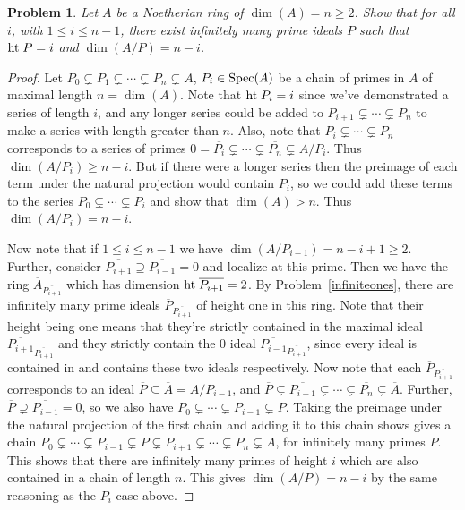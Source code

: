 \documentclass{article}
\newcommand{\spec}{\textup{Spec}}
\newcommand{\Ht}{\textup{ht}\;}
\newtheorem{problem}{Problem}
\begin{document}
\begin{problem}
Let $A$ be a Noetherian ring of $\dim(A) = n \geq 2$. Show that for all $i$, with $1 \leq i \leq n-1$, there exist infinitely many prime ideals $P$ such that $\Ht P = i$ and $\dim(A/P) = n-i$.
\end{problem}
\begin{proof}
Let $P_0 \subsetneq P_1 \subsetneq \cdots \subsetneq P_n \subsetneq A$, $P_i \in \spec(A)$ be a chain of primes in $A$ of maximal length $n = \dim(A)$. Note that $\Ht P_i = i$ since we've demonstrated a series of length $i$, and any longer series could be added to $P_{i+1} \subsetneq \cdots \subsetneq P_n$ to make a series with length greater than $n$. Also, note that $P_i \subsetneq \cdots \subsetneq P_n$ corresponds to a series of primes $0 = \overline{P_i} \subsetneq \cdots \subsetneq \overline{P_n} \subsetneq A/P_i$. Thus $\dim(A/P_i) \geq n-i$. But if there were a longer series then the preimage of each term under the natural projection would contain $P_i$, so we could add these terms to the series $P_0 \subsetneq \cdots \subsetneq P_i$ and show that $\dim(A) > n$. Thus $\dim(A/P_i) = n - i$.

Now note that if $1 \leq i \leq n-1$ we have $\dim(A/P_{i-1}) = n - i + 1 \geq 2$. Further, consider $\overline{P_{i+1}} \supseteq \overline{P_{i-1}} = 0$ and localize at this prime. Then we have the ring $\overline{A}_{\overline{P_{i+1}}}$ which has dimension $\Ht \overline{P_{i+1}} = 2$. By Problem~\ref{infiniteones}, there are infinitely many prime ideals $\overline{P}_{\overline{P_{i+1}}}$ of height one in this ring. Note that their height being one means that they're strictly contained in the maximal ideal $\overline{P_{i+1}}_{\overline{P_{i+1}}}$ and they strictly contain the $0$ ideal $\overline{P_{i-1}}_{\overline{P_{i+1}}}$, since every ideal is contained in and contains these two ideals respectively. Now note that each $\overline{P}_{\overline{P_{i+1}}}$ corresponds to an ideal $\overline{P} \subseteq \overline{A} = A/P_{i-1}$, and $\overline{P} \subsetneq \overline{P_{i+1}} \subsetneq \cdots \subsetneq \overline{P_n} \subsetneq \overline{A}$. Further, $\overline{P} \supsetneq \overline{P_{i-1}} = 0$, so we also have $P_0 \subsetneq \cdots \subsetneq P_{i-1} \subsetneq P$. Taking the preimage under the natural projection of the first chain and adding it to this chain shows gives a chain $P_0 \subsetneq \cdots \subsetneq P_{i-1} \subsetneq P \subsetneq P_{i+1} \subsetneq \cdots \subsetneq P_n \subsetneq A$, for infinitely many primes $P$. This shows that there are infinitely many primes of height $i$ which are also contained in a chain of length $n$. This gives $\dim(A/P) = n-i$ by the same reasoning as the $P_i$ case above.
\end{proof}
\end{document}
